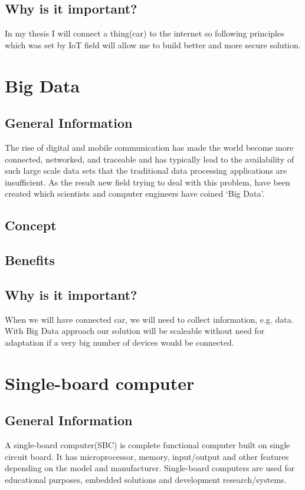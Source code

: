 \subsection{Why is it important?}
In my thesis I will connect a thing(car) to the internet so following principles which was set by IoT field will allow me to build better and more secure solution\cite{IoT_standart}.
\section{Big Data}
\subsection{General Information}
The rise of digital and mobile communication has made the world become more connected, networked, and traceable and has typically lead to the availability of such large scale data sets that the traditional data processing applications are insufficient. As the result new field trying to deal with this problem, have been created which scientists and computer engineers have coined `Big Data'.
\subsection{Concept}
\subsection{Benefits}
\subsection{Why is it important?}
When we will have connected car, we will need to collect information, e.g. data. With Big Data approach our solution will be scaleable without need for adaptation if a very big number of devices would be connected.
\section{Single-board computer}
\subsection{General Information}
A single-board computer(SBC) is complete functional computer built on single circuit board. It has microprocessor, memory, input/output and other features depending on the model and manufacturer. Single-board computers are used for educational purposes, embedded solutions and development research/systems.
